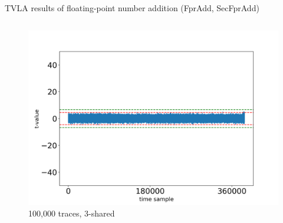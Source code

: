 \begin{frame}{TVLA results of floating-point number addition (FprAdd, SecFprAdd)}
\begin{columns}[T]
\begin{figure}
\includegraphics[width=\textwidth]{figure/tvla-F4-CHES/SecFprAdd_3shares_100k.png}
\vspace{-20pt}
\caption{100,000 traces, 3-shared}
\end{figure}

\end{columns}


\end{frame}


%
%
%



